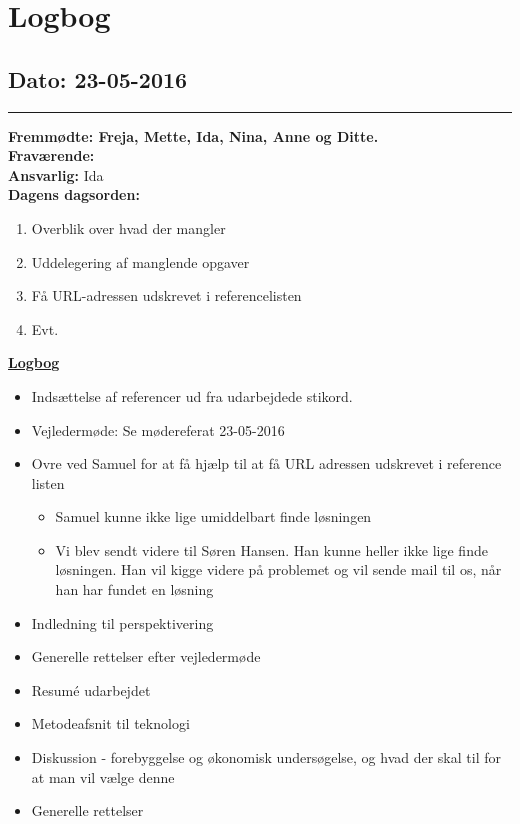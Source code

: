 \chapter{Logbog}
\section{Dato: 23-05-2016}
\hrule
\textbf{Fremmødte: Freja, Mette, Ida, Nina, Anne og Ditte.} \\
\textbf{Fraværende: } \\
\textbf{Ansvarlig:} Ida  \\
\textbf{Dagens dagsorden: }
\begin{enumerate}
	\item Overblik over hvad der mangler
	\item Uddelegering af manglende opgaver
	\item Få URL-adressen udskrevet i referencelisten
	\item Evt. 
\end{enumerate}

\underline{\textbf{Logbog}}
\begin{itemize}
\item Indsættelse af referencer ud fra udarbejdede stikord.
\item Vejledermøde: Se mødereferat 23-05-2016
\item Ovre ved Samuel for at få hjælp til at få URL adressen udskrevet i reference listen
\begin{itemize}
\item Samuel kunne ikke lige umiddelbart finde løsningen
\item Vi blev sendt videre til Søren Hansen. Han kunne heller ikke lige finde løsningen. Han vil kigge videre på problemet og vil sende mail til os, når han har fundet en løsning
\end{itemize}
\item Indledning til perspektivering
\item Generelle rettelser efter vejledermøde
\item Resumé udarbejdet
\item Metodeafsnit til teknologi
\item Diskussion - forebyggelse og økonomisk undersøgelse, og hvad der skal til for at man vil vælge denne
\item Generelle rettelser
\end{itemize}

\newpage